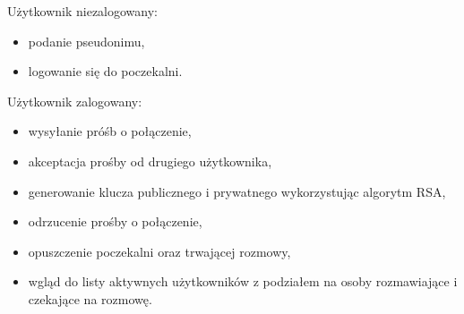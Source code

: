 \noindent Użytkownik niezalogowany: 
\begin{itemize}
\item podanie pseudonimu,
\item logowanie się do poczekalni.
\end{itemize}
Użytkownik zalogowany:
\begin{itemize}
	\item wysyłanie próśb o połączenie,
	\item akceptacja prośby od drugiego użytkownika,
	\item generowanie klucza publicznego i prywatnego wykorzystując algorytm RSA,
	\item odrzucenie prośby o połączenie,
	\item opuszczenie poczekalni oraz trwającej rozmowy,
	\color{red}
	\item wgląd do listy aktywnych użytkowników z podziałem na osoby rozmawiające i czekające na rozmowę.
	
	
\end{itemize}
